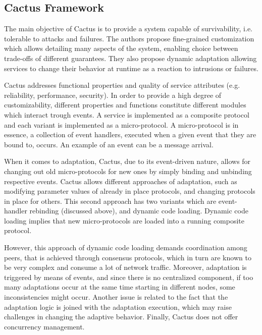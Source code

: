 \subsection{Cactus Framework}
\label{ssec:cactusframework}
\par The main objective of Cactus \cite{Hiltunen1999} is to provide a system capable of survivability, i.e. tolerable to attacks and failures. The authors propose fine-grained customization which allows detailing many aspects of the system, enabling choice between trade-offs of different guarantees. They also propose dynamic adaptation allowing services to change their behavior at runtime as a reaction to intrusions or failures.
\par Cactus addresses functional properties and quality of service attributes (e.g. reliability, performance, security). In order to provide a high degree of customizability, different properties and functions constitute different modules which interact trough events. A service is implemented as a composite protocol and each variant is implemented as a micro-protocol. A micro-protocol is in essence, a collection of event handlers, executed when a given event that they are bound to, occurs. An example of an event can be a message arrival.
\par When it comes to adaptation, Cactus, due to its event-driven nature, allows for changing out old micro-protocols for new ones by simply binding and unbinding respective events. Cactus allows different approaches of adaptation, such as modifying parameter values of already in place protocols, and changing protocols in place for others. This second approach has two variants which are event-handler rebinding (discussed above), and dynamic code loading. Dynamic code loading implies that new micro-protocols are loaded into a running composite protocol.
\par However, this approach of dynamic code loading demands coordination among peers, that is achieved through consensus protocols, which in turn are known to be very complex and consume a lot of network traffic. Moreover, adaptation is triggered by means of events, and since there is no centralized component, if too many adaptations occur at the same time starting in different nodes, some inconsistencies might occur. Another issue is related to the fact that the adaptation logic is joined with the adaptation execution, which may raise challenges in changing the adaptive behavior. Finally, Cactus does not offer concurrency management.
%
%
%
